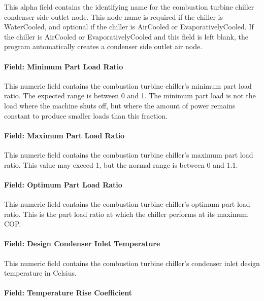This alpha field contains the identifying name for the combustion turbine chiller condenser side outlet node. This node name is required if the chiller is WaterCooled, and optional if the chiller is AirCooled or EvaporativelyCooled. If the chiller is AirCooled or EvaporativelyCooled and this field is left blank, the program automatically creates a condenser side outlet air node.

\paragraph{Field: Minimum Part Load Ratio}\label{field-minimum-part-load-ratio-6}

This numeric field contains the combustion turbine chiller's minimum part load ratio. The expected range is between 0 and 1. The minimum part load is not the load where the machine shuts off, but where the amount of power remains constant to produce smaller loads than this fraction.

\paragraph{Field: Maximum Part Load Ratio}\label{field-maximum-part-load-ratio-6}

This numeric field contains the combustion turbine chiller's maximum part load ratio. This value may exceed 1, but the normal range is between 0 and 1.1.

\paragraph{Field: Optimum Part Load Ratio}\label{field-optimum-part-load-ratio-6}

This numeric field contains the combustion turbine chiller's optimum part load ratio. This is the part load ratio at which the chiller performs at its maximum COP.

\paragraph{Field: Design Condenser Inlet Temperature}\label{field-design-condenser-inlet-temperature-4}

This numeric field contains the combustion turbine chiller's condenser inlet design temperature in Celsius.

\paragraph{Field: Temperature Rise Coefficient}\label{field-temperature-rise-coefficient-2}

